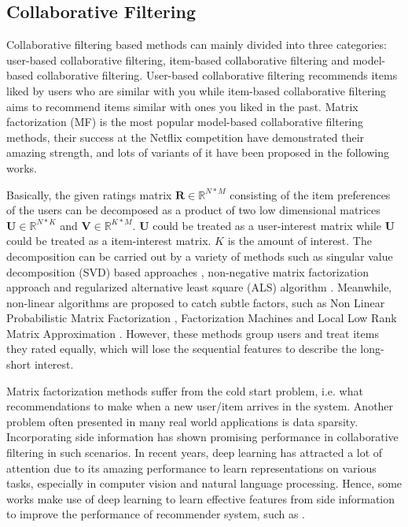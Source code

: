 \documentclass{sig-alternate-05-2015}
\begin{document}
\subsection{Collaborative Filtering}
Collaborative filtering based methods can mainly divided into three categories:
user-based collaborative filtering, item-based collaborative filtering and
model-based collaborative filtering.
User-based collaborative filtering \cite{resnick1994grouplens} recommends
items liked by users who are similar with you
while item-based collaborative filtering \cite{sarwar2001item} aims to
recommend items similar with ones you liked in the past.
Matrix factorization (MF) is the most popular model-based collaborative filtering methods,
their success at the Netflix competition \cite{koren2009matrix, bennett2007netflix}
have demonstrated their amazing strength,
and lots of variants of it have been proposed in the following works.

Basically, the given ratings matrix $\mathbf{R} \in \mathbb{R}^{N*M}$
consisting of the item preferences of the users can be decomposed as
a product of two low dimensional matrices $\mathbf{U} \in \mathbb{R}^{N*K}$
and $\mathbf{V} \in \mathbb{R}^{K*M}$.
$\mathbf{U}$ could be treated as a user-interest matrix while
$\mathbf{U}$ could be treated as a item-interest matrix.
$K$ is the amount of interest.
The decomposition can be carried out by a variety of methods
such as singular value decomposition (SVD) based approaches \cite{mazumder2010spectral},
non-negative matrix factorization approach \cite{lee2001algorithms}
and regularized alternative least square (ALS) algorithm \cite{zhou2008large}.
Meanwhile, non-linear algorithms are proposed to catch subtle factors,
such as Non Linear Probabilistic Matrix Factorization \cite{lawrence2009non},
Factorization Machines \cite{rendle2010factorization} and
Local Low Rank Matrix Approximation \cite{lee2013local}.
However, these methods group users and treat items they rated equally,
which will lose the sequential features to describe the long-short interest.

Matrix factorization methods suffer from the cold start problem,
i.e. what recommendations to make when a new user/item arrives in the system.
Another problem often presented in many real world applications is data sparsity.
Incorporating side information has shown promising performance
in collaborative filtering in such scenarios.
In recent years, deep learning \cite{hinton2006reducing, hinton2006fast}
has attracted a lot of attention due to its amazing performance
to learn representations on various tasks,
especially in computer vision and natural language processing.
Hence, some works make use of deep learning to learn effective
features from side information to improve the performance of recommender system,
such as \cite{salakhutdinov2007restricted, van2013deep, wang2015collaborative, li2015deep}.
\end{document}
